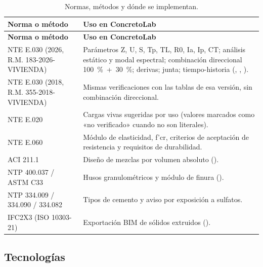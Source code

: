 \begin{longtable}{L{4.3cm}L{9.5cm}}
	\caption{Normas, métodos y dónde se implementan.} \label{tab:t-normas} \\
	\hline
	\textbf{Norma o método} & \textbf{Uso en ConcretoLab} \\ \hline
	\endfirsthead
	\hline
	\textbf{Norma o método} & \textbf{Uso en ConcretoLab} \\ \hline
	\endhead
	\hline
	\endfoot
	NTE E.030 (2026, R.M. 183-2026-VIVIENDA) & Parámetros Z, U, S, Tp, TL, R0, Ia, Ip, CT; análisis estático y modal espectral;
	combinación direccional 100~\%~+~30~\%; derivas; junta; tiempo-historia (,
	, ). \\
	NTE E.030 (2018, R.M. 355-2018-VIVIENDA) & Mismas verificaciones con las tablas de esa versión, sin combinación direccional. \\
	NTE E.020 & Cargas vivas sugeridas por uso (valores marcados como «no verificado» cuando no son literales). \\
	NTE E.060 & Módulo de elasticidad, f'cr, criterios de aceptación de resistencia y requisitos de durabilidad. \\
	ACI 211.1 & Diseño de mezclas por volumen absoluto (). \\
	NTP 400.037 / ASTM C33 & Husos granulométricos y módulo de finura (). \\
	NTP 334.009 / 334.090 / 334.082 & Tipos de cemento y aviso por exposición a sulfatos. \\
	IFC2X3 (ISO 10303-21) & Exportación BIM de sólidos extruidos (). \\
\end{longtable}

\subsection{Tecnologías}

